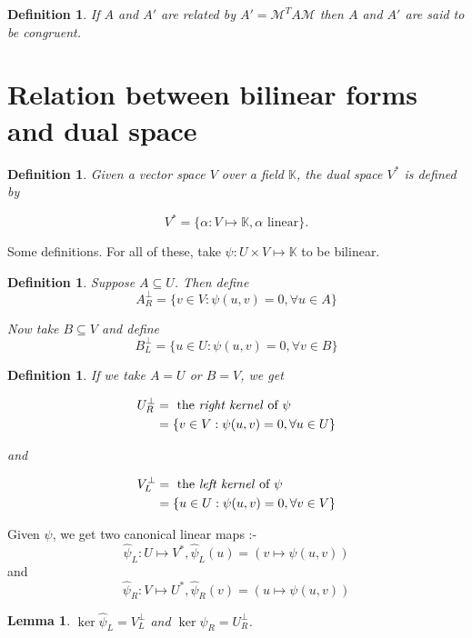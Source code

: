 \documentclass{notes}
\theoremstyle{plain}
\newtheorem{definition}[theorem]{Definition}
\newtheorem{lemma}[theorem]{Lemma}
\begin{document}
\begin{definition}
  If $A$ and $A'$ are related by $A' = \mathcal{M}^{T} A \mathcal{M}$
  then $A$ and $A'$ are said to be congruent.
\end{definition}

\section{Relation between bilinear forms and dual space}

\begin{definition}
  Given a vector space $V$ over a field $\mathbb{K}$, the \emph{dual
    space} $V^*$ is defined by

\[
V^* = \{ \alpha : V \mapsto \mathbb{K}, \alpha \text{ linear}\}.
\]
\end{definition}

Some definitions.  For all of these, take $\psi : U \times V \mapsto
\mathbb{K}$ to be bilinear.

\begin{definition}
  Suppose $A \subseteq U$.  Then define
\[
A_{R}^{\perp} = \{ v \in V : \psi (u,v) = 0, \forall u \in A\}
\]

Now take $B \subseteq V$ and define
\[
B_{L}^{\perp} = \{ u \in U : \psi (u,v) = 0, \forall v \in B\}
\]
\end{definition}

\begin{definition}
  If we take $A = U$ or $B = V$, we get

\begin{align*}
  U_{R}^{\perp} &= \text{ the \emph{right kernel} of $\psi$} \\
  &= \{v \in V : \psi(u,v) = 0, \forall u \in U\}
\end{align*}

and

\begin{align*}
  V_{L}^{\perp} &= \text{ the \emph{left kernel} of $\psi$}\\
  &= \{u \in U : \psi(u,v) = 0, \forall v \in V\}
\end{align*}
\end{definition}

Given $\psi$, we get two canonical linear maps :-
\[
\widehat{\psi}_{L} : U \mapsto V^*, \widehat{\psi}_L(u) = \left( v
  \mapsto \psi(u,v) \right)
\]
and
\[
\widehat{\psi}_{R} : V \mapsto U^*, \widehat{\psi}_R(v) = \left( u
  \mapsto \psi(u,v) \right)
\]

\begin{lemma}
  $\ker \widehat{\psi}_{L} = V_{L}^{\perp}$ and
  $\ker \widehat{\psi}_{R} = U_{R}^{\perp}$.
\end{lemma}
\end{document}
